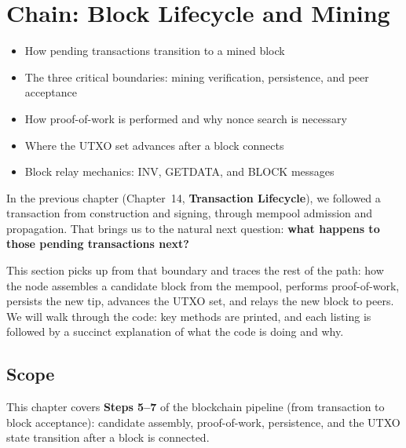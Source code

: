 \chapter{Chain: Block Lifecycle and Mining}
\label{ch:block-lifecycle}

\begin{learnbox}
\begin{itemize}
  \item How pending transactions transition to a mined block
  \item The three critical boundaries: mining verification, persistence, and peer acceptance
  \item How proof-of-work is performed and why nonce search is necessary
  \item Where the UTXO set advances after a block connects
  \item Block relay mechanics: INV, GETDATA, and BLOCK messages
\end{itemize}
\end{learnbox}

In the previous chapter (Chapter~14, \textbf{Transaction Lifecycle}), we followed a transaction from construction and signing, through mempool admission and propagation. That brings us to the natural next question: \textbf{what happens to those pending transactions next?}

This section picks up from that boundary and traces the rest of the path: how the node assembles a candidate block from the mempool, performs proof-of-work, persists the new tip, advances the UTXO set, and relays the new block to peers. We will walk through the code: key methods are printed, and each listing is followed by a succinct explanation of what the code is doing and why.

\section{Scope}
\label{sec:ch09-6-scope}

This chapter covers \textbf{Steps 5--7} of the blockchain pipeline (from transaction to block acceptance): candidate assembly, proof-of-work, persistence, and the UTXO state transition after a block is connected.

